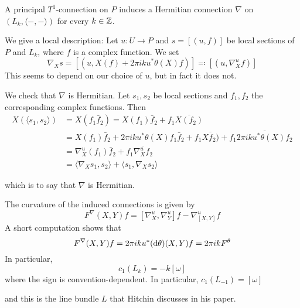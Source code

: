 \documentclass[parskip=half]{scrartcl}
\begin{document}
\begin{onboard}
\begin{prop}
	A principal $T^1$-connection on $P$ induces a Hermitian connection $\nabla$ on $(L_k,\langle-,-\rangle)$ for every $k\in\mathbb{Z}$.
\end{prop}
\end{onboard}
\begin{myproof}
	\begin{onboard}
	We give a local description: Let $u:U\to P$ and $s=[(u,f)]$ be local sections of $P$ and $L_k$, where $f$ is a complex function. We set
	\begin{equation*}
		\nabla_X s=[(u,X(f)+2\pi i k u^*\theta(X)f)]\eqqcolon [(u,\nabla^u_X f)]
	\end{equation*} 
	This seems to depend on our choice of $u$, but in fact it does not.
	
	We check that $\nabla$ is Hermitian. Let $s_1,s_2$ be local sections and $f_1,f_2$ the corresponding complex functions. Then
	\begin{align*}
		X(\langle s_1,s_2\rangle)&=X(f_1\bar f_2)=X(f_1)\bar f_2+f_1\overline{X (f_2)}\\
		&=X(f_1)\bar f_2+2\pi i k u^*\theta(X)f_1 \bar f_2 + f_1\overline{X f_2)}+f_1\overline{2\pi i k u^*\theta(X)f_2}\\
		&=\nabla^u_X(f_1)\bar f_2+f_1\overline{\nabla^u_X f_2}\\
		&=\langle \nabla_X s_1,s_2\rangle+\langle s_1,\nabla_X s_2\rangle
	\end{align*}
	\end{onboard}
	which is to say that $\nabla$ is Hermitian. 
\end{myproof}

\begin{rem}
	\begin{onboard}
	The curvature of the induced connections is given by
	\begin{equation*}
		F^\nabla(X,Y) f=[\nabla^u_X,\nabla^u_Y] f -\nabla^u_{[X,Y]}f
	\end{equation*}
	A short computation shows that
	\begin{equation*}
		F^\nabla(X,Y)f=2\pi i k u^*(\mathrm{d} \theta)(X,Y)f=2\pi i k F^\theta
	\end{equation*}
	In particular, 
	\begin{equation*}
		c_1(L_k)=-k[\omega]
	\end{equation*}
	where the sign is convention-dependent. In particular, $c_1(L_{-1})=[\omega]$
	\end{onboard} 
	and this is the line bundle $L$ that Hitchin discusses in his paper.
\end{rem}
\end{document}
